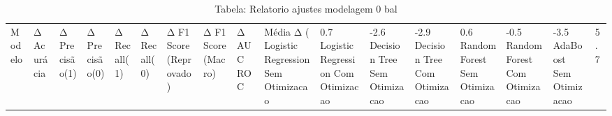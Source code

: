 \begin{table}[H] %
    \centering
    \caption{Tabela: Relatorio ajustes modelagem 0 bal}
    \label{tab:relatorio_ajustes_modelagem_0_bal}
    \renewcommand{\arraystretch}{1.25} %
    \begin{adjustwidth}{ -1in }{ -1in } %
    \centering %
    \small %
    \begin{tabular}{lllllllllll}
\toprule
                            Modelo & Δ Acurácia & Δ Precisão(1) & Δ Precisão(0) & Δ Recall(1) & Δ Recall(0) & Δ F1 Score (Reprovado) & Δ F1 Score (Macro) & Δ AUC ROC & Média Δ (%
\midrule
Logistic Regression Sem Otimizacao &       0.7%
Logistic Regression Com Otimizacao &      -2.6%
      Decision Tree Sem Otimizacao &      -2.9%
      Decision Tree Com Otimizacao &       0.6%
      Random Forest Sem Otimizacao &      -0.5%
      Random Forest Com Otimizacao &      -3.5%
           AdaBoost Sem Otimizacao &       5.7%

\end{tabular}
\end{adjustwidth}
\end{table}
